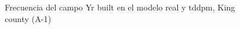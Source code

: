 \begin{figure}[H]
    \centering
    
    \caption{Frecuencia del campo Yr built en el modelo real y tddpm, King county (A-1)}
    \label{frecuency-tddpm-yr built}
\end{figure}